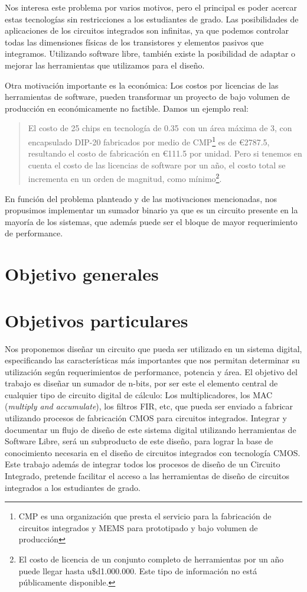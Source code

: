 Nos interesa este problema por varios motivos, pero el principal es poder acercar estas tecnologías sin restricciones a los estudiantes de grado. Las posibilidades de aplicaciones de los circuitos integrados son infinitas, ya que podemos controlar todas las dimensiones físicas de los transistores y elementos pasivos que integramos. Utilizando software libre, también existe la posibilidad de adaptar o mejorar las herramientas que utilizamos para el diseño.

Otra motivación importante es la económica: Los costos por licencias de las herramientas de software, pueden transformar un proyecto de bajo volumen de producción en económicamente no factible. Damos un ejemplo real: 

\begin{quote}
El costo de 25 chips en tecnología de 0.35~\microm con un área máxima de 3\mmcuadrado, con encapsulado DIP-20 fabricados por medio de CMP\footnote{CMP es una organización que presta el servicio para la fabricación de circuitos integrados y MEMS para prototipado y bajo volumen de producción} es de \euro{2787.5}, resultando el costo de fabricación en \euro{111.5} por unidad. Pero si tenemos en cuenta el costo de las licencias de software por un año, el costo total se incrementa en un orden de magnitud, como mínimo\footnote{El costo de licencia de un conjunto completo de herramientas por un año puede llegar hasta u\$d1.000.000. Este tipo de información no está públicamente disponible.}.
\end{quote}

En función del problema planteado y de las motivaciones mencionadas, nos propusimos implementar un sumador binario ya que es un circuito presente en la mayoría de los sistemas, que además puede ser el bloque de mayor requerimiento de performance.
\section{Objetivo generales}


\section{Objetivos particulares}
Nos proponemos diseñar un circuito que pueda ser utilizado en un sistema digital, especificando las características más importantes que nos permitan determinar su utilización según requerimientos de performance, potencia y área.
El objetivo del trabajo es diseñar un sumador de n-bits, por ser este el elemento central de cualquier tipo de circuito digital de cálculo: Los multiplicadores, los MAC (\emph{multiply and accumulate}), los filtros FIR, etc, que pueda ser enviado a fabricar utilizando
procesos de fabricación CMOS para circuitos integrados. Integrar y documentar un flujo de diseño
de este sistema digital utilizando herramientas de Software Libre, será un subproducto de este
diseño, para lograr la base de conocimiento necesaria en el diseño de circuitos integrados con
tecnología CMOS. Este trabajo además de integrar todos los procesos de diseño de un Circuito
Integrado, pretende facilitar el acceso a las herramientas de diseño de circuitos integrados a los estudiantes de grado.
